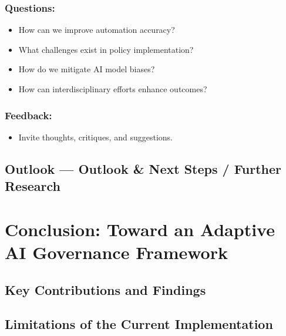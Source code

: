 \documentclass[
  letterpaper,
]{book}
\providecommand{\tightlist}{%
  \setlength{\itemsep}{0pt}\setlength{\parskip}{0pt}}
\begin{document}
\subsubsection{Questions:}\label{questions}

\begin{itemize}
\tightlist
\item
  How can we improve automation accuracy?\\
\item
  What challenges exist in policy implementation?\\
\item
  How do we mitigate AI model biases?\\
\item
  How can interdisciplinary efforts enhance outcomes?
\end{itemize}

\subsubsection{Feedback:}\label{feedback}

\begin{itemize}
\tightlist
\item
  Invite thoughts, critiques, and suggestions.
\end{itemize}

\subsection{Outlook --- Outlook \& Next Steps / Further
Research}\label{outlook-outlook-next-steps-further-research-1}

\section{Conclusion: Toward an Adaptive AI Governance
Framework}\label{conclusion-toward-an-adaptive-ai-governance-framework}

\subsection{Key Contributions and
Findings}\label{key-contributions-and-findings}

\subsection{Limitations of the Current
Implementation}\label{limitations-of-the-current-implementation}
\end{document}
